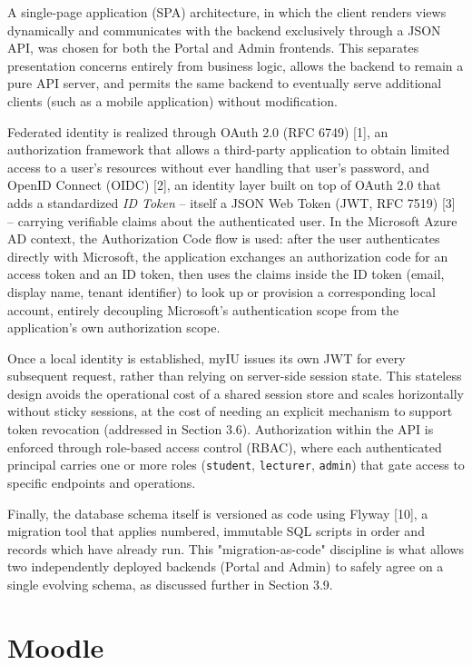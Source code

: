 \documentclass[12pt,a4paper]{report}
\begin{document}
A single-page application (SPA) architecture, in which the client
renders views dynamically and communicates with the backend exclusively
through a JSON API, was chosen for both the Portal and Admin
frontends. This separates presentation concerns entirely from business
logic, allows the backend to remain a pure API server, and permits the
same backend to eventually serve additional clients (such as a mobile
application) without modification.

Federated identity is realized through OAuth 2.0 (RFC 6749) [1], an
authorization framework that allows a third-party application to obtain
limited access to a user's resources without ever handling that user's
password, and OpenID Connect (OIDC) [2], an identity layer built on top
of OAuth 2.0 that adds a standardized \emph{ID Token} -- itself a JSON
Web Token (JWT, RFC 7519) [3] -- carrying verifiable claims about the
authenticated user. In the Microsoft Azure AD context, the
Authorization Code flow is used: after the user authenticates directly
with Microsoft, the application exchanges an authorization code for an
access token and an ID token, then uses the claims inside the ID token
(email, display name, tenant identifier) to look up or provision a
corresponding local account, entirely decoupling Microsoft's
authentication scope from the application's own authorization scope.

Once a local identity is established, myIU issues its own JWT for every
subsequent request, rather than relying on server-side session state.
This stateless design avoids the operational cost of a shared session
store and scales horizontally without sticky sessions, at the cost of
needing an explicit mechanism to support token revocation (addressed in
Section 3.6). Authorization within the API is enforced through
role-based access control (RBAC), where each authenticated principal
carries one or more roles (\texttt{student}, \texttt{lecturer},
\texttt{admin}) that gate access to specific endpoints and operations.

Finally, the database schema itself is versioned as code using Flyway
[10], a migration tool that applies numbered, immutable SQL scripts in
order and records which have already run. This "migration-as-code"
discipline is what allows two independently deployed backends (Portal
and Admin) to safely agree on a single evolving schema, as discussed
further in Section 3.9.

\section{Moodle}
\end{document}
